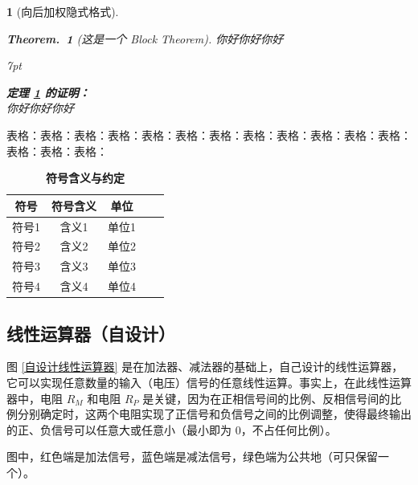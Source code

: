 \documentclass[a4paper]{article}  %
\newenvironment{graybox}{%
\def\FrameCommand{%
\hspace{1pt}%
{\color{gray}\small \vrule width 2pt}%
{\color{graybox_color}\vrule width 4pt}%
\colorbox{graybox_color}%
}%
\MakeFramed{\advance\hsize-\width\FrameRestore}%
\noindent\hspace{-4.55pt}%
\begin{adjustwidth}{}{7pt}%
\vspace{2pt}\vspace{2pt}%
}
{%
\vspace{2pt}\end{adjustwidth}\endMakeFramed%
}
\theoremstyle{MyLineTheoremStyle} %
\theoremstyle{MyBlockTheoremStyle} %
\newtheorem{BlockTheorem}[LineTheorem]{Theorem.\,} %
\theoremstyle{MySubsubsectionStyle} %
\newtheorem{definition}{}
\renewcommand{\small}{\fontsize{5pt}{3.5pt}\selectfont}
\begin{document}
\begin{multicols*}{4}
\begin{definition}[向后加权隐式格式]
\begin{BlockTheorem}[这是一个 Block Theorem]\label{这是一个 Block Theorem}
你好你好你好
\end{BlockTheorem}



\begin{graybox}
\textbf{定理 \ref{这是一个 Block Theorem} 的证明：}\\
你好你好你好
\end{graybox}


\end{definition}

表格：表格：表格：表格：表格：表格：表格：表格：表格：表格：表格：表格：表格：表格：表格：

\begin{table}[H]
\centering
\caption{\textbf{符号含义与约定}}
\label{tab:waterpump}
\begin{tabular}{ccccc}
\toprule
符号 & 符号含义& 单位\\
\midrule
符号1& 含义1& 单位1\\
符号2& 含义2& 单位2\\
符号3& 含义3& 单位3\\
符号4& 含义4& 单位4\\
\bottomrule
\end{tabular}
\end{table}

\subsection{线性运算器（自设计）}
图 \ref{自设计线性运算器} 是在加法器、减法器的基础上，自己设计的线性运算器，它可以实现任意数量的输入（电压）信号的任意线性运算。事实上，在此线性运算器中，电阻 $R_M$ 和电阻 $R_P$ 是关键，因为在正相信号间的比例、反相信号间的比例分别确定时，这两个电阻实现了正信号和负信号之间的比例调整，使得最终输出的正、负信号可以任意大或任意小（最小即为 0，不占任何比例）。

图中，红色端是加法信号，蓝色端是减法信号，绿色端为公共地（可只保留一个）。

\setlength{\floatsep}{12pt plus 2pt minus 2pt} %
\setlength{\textfloatsep}{18pt plus 2pt minus 4pt} %
\setlength{\intextsep}{12pt plus 2pt minus 2pt} %


\end{multicols*}
\end{document}
